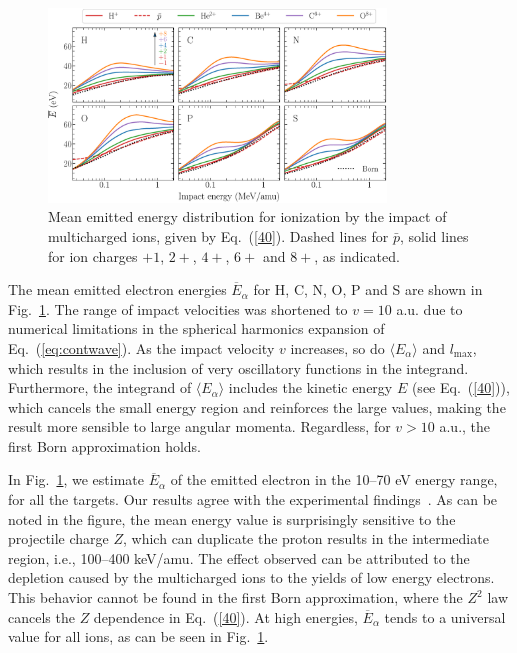 \documentclass[10pt,showpacs,twocolumn]{revtex4}
\begin{document}
\begin{figure}[t!]
\centering
\includegraphics[width=0.8\textwidth]{ener_mean.eps}
\caption{Mean emitted energy distribution for ionization by the impact 
of multicharged ions, given by Eq.~(\ref{40}). Dashed lines for $\bar{p}$,
solid lines for ion charges $+1$, $2+$, $4+$, $6+$ and $8+$,
as indicated.}
\label{fig:emittedener}
\end{figure} 

The mean emitted electron energies $\overline{E}_{\alpha}$ for H, C, N, 
O, P and S are shown in Fig.~\ref{fig:emittedener}. The range of impact 
velocities was shortened to $v=10$ a.u. due to numerical limitations 
in the spherical harmonics expansion of Eq.~(\ref{eq:contwave}). 
As the impact velocity $v$ increases, so do $\langle E_{\alpha}\rangle$
and $l_{\max}$, which results in the inclusion of very oscillatory 
functions in the integrand. Furthermore, the integrand of
$\langle E_{\alpha}\rangle$ includes the kinetic energy $E$
(see Eq.~(\ref{40})), which cancels the small energy region and 
reinforces the large values, making the result more sensible to large
angular momenta. Regardless, for $v>10$ a.u., the first Born 
approximation holds.

In Fig.~\ref{fig:emittedener}, we estimate $\overline{E}_{\alpha}$ of
the emitted electron in the 10--70 eV energy range,
for all the targets. Our results agree with the 
experimental findings~\cite{surdutovic2018}. As can be noted in the 
figure, the mean energy value is surprisingly sensitive to the 
projectile charge $Z$, which can duplicate the proton results in the 
intermediate region, i.e., 100--400 keV/amu. The effect observed can be 
attributed to the depletion caused by the multicharged ions to the 
yields of low energy electrons. This behavior cannot be found in the 
first Born approximation, where the $Z^2$ law cancels the $Z$ dependence
in Eq.~(\ref{40}). At high energies, $\overline{E}_{\alpha}$ tends to a 
universal value for all ions, as can be seen in Fig.~\ref{fig:emittedener}.
\end{document}
